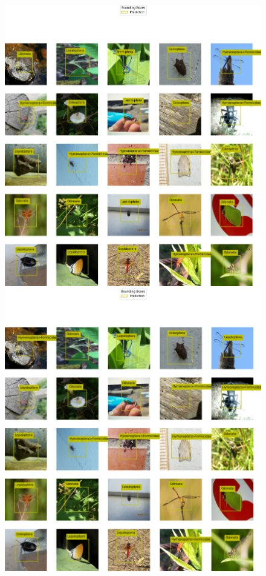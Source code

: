 \begin{figure}[!ht]
    \centering
    \begin{minipage}{.45\textwidth}
    \includegraphics[width=\textwidth]{images/pca-ridge-svm-two-stage-model-predictions.png}
    \end{minipage}
    \hfill
    \begin{minipage}{.45\textwidth}
    \includegraphics[width=\textwidth]{images/pca-400-ridge-svm-two-stage-model-predictions.png}

\end{minipage}
\end{figure}
